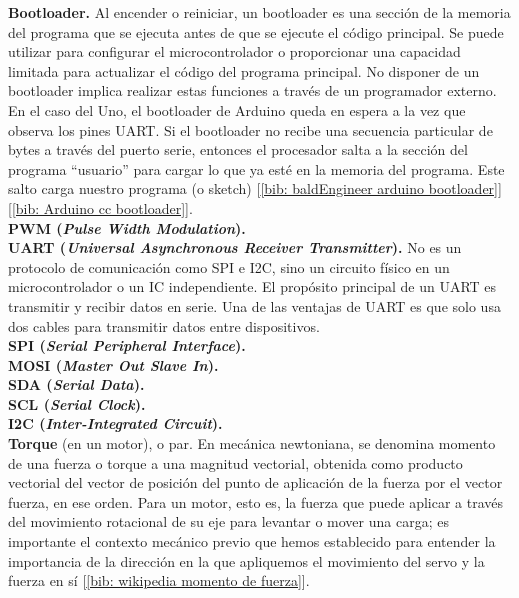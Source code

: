 \documentclass[12pt]{article}
\begin{document}
	\noindent \textbf{\large Bootloader.} Al encender o reiniciar, un bootloader es una sección de la memoria del programa que se ejecuta antes de que se ejecute el código principal. Se puede utilizar para configurar el microcontrolador o proporcionar una capacidad limitada para actualizar el código del programa principal. No disponer de un bootloader implica realizar estas funciones a través de un programador externo. \\
	\noindent En el caso del Uno, el bootloader de Arduino queda en espera a la vez que observa los pines UART. Si el bootloader no recibe una secuencia particular de bytes a través del puerto serie, entonces el procesador salta a la sección del programa ``usuario'' para cargar lo que ya esté en la memoria del programa. Este salto carga nuestro programa (o sketch) [\ref{bib: baldEngineer arduino bootloader}][\ref{bib: Arduino cc  bootloader}].\\
	
	\noindent \textbf{\large PWM (\textit{Pulse Width Modulation}).} \\
	
	\noindent \textbf{\large UART (\textit{Universal Asynchronous Receiver Transmitter}).} No es un protocolo de comunicación como SPI e I2C, sino un circuito físico en un microcontrolador o un IC independiente. El propósito principal de un UART es transmitir y recibir datos en serie. Una de las ventajas de UART es que solo usa dos cables para transmitir datos entre dispositivos.\\
	
	\noindent \textbf{\large SPI (\textit{Serial Peripheral Interface}).} \\
		
	\noindent \textbf{\large MOSI (\textit{Master Out Slave In}).} \\
	
	\noindent \textbf{\large SDA (\textit{Serial Data}).} \\
	
	\noindent \textbf{\large SCL (\textit{Serial Clock}).} \\
	
	\noindent \textbf{\large I2C (\textit{Inter-Integrated Circuit}).} \\
	
	\noindent \textbf{\large Torque} (en un motor), o par. En mecánica newtoniana, se denomina momento de una fuerza o torque a una magnitud vectorial, obtenida como producto vectorial del vector de posición del punto de aplicación de la fuerza por el vector fuerza, en ese orden. Para un motor, esto es, la fuerza que puede aplicar a través del movimiento rotacional de su eje para levantar o mover una carga; es importante el contexto mecánico previo que hemos establecido para entender la importancia de la dirección en la que apliquemos el movimiento del servo y la fuerza en sí [\ref{bib: wikipedia momento de fuerza}].\\
	
\end{document}
